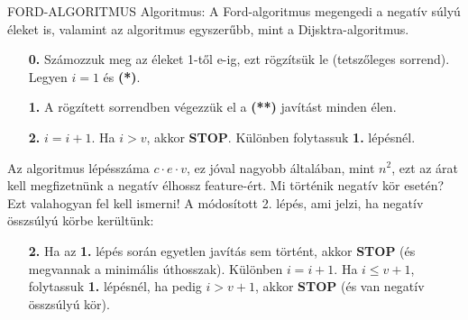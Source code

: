 \documentclass[]{article}
\begin{document}
\begin{framed}
FORD-ALGORITMUS Algoritmus: A Ford-algoritmus megengedi a negatív súlyú éleket is, valamint az algoritmus egyszerűbb, mint a Dijsktra-algoritmus.
\begin{itemize}
\item[\textbf{0.}] Számozzuk meg az éleket 1-től e-ig, ezt rögzítsük le (tetszőleges sorrend). Legyen $i = 1$ és \textbf{(*)}.
\item[\textbf{1.}] A rögzített sorrendben végezzük el a \textbf{(**)} javítást minden élen.
\item[\textbf{2.}] $i = i + 1$. Ha $i > v$, akkor \textbf{STOP}. Különben folytassuk \textbf{1.} lépésnél.
\end{itemize}
Az algoritmus lépésszáma $c\cdot e\cdot v$, ez jóval nagyobb általában, mint $n^2$, ezt az árat kell megfizetnünk a negatív élhossz feature-ért. Mi történik negatív kör esetén? Ezt valahogyan fel kell ismerni! A módosított 2. lépés, ami jelzi, ha negatív összsúlyú körbe kerültünk:
\begin{itemize}
\item[\textbf{2.}] Ha az \textbf{1.} lépés során egyetlen javítás sem történt, akkor \textbf{STOP} (és megvannak a minimális úthosszak). Különben $i = i + 1$. Ha $i \leq v + 1$, folytassuk \textbf{1.} lépésnél, ha pedig $i > v + 1$, akkor \textbf{STOP} (és van negatív összsúlyú kör).
\end{itemize}
\end{framed}
\end{document}
